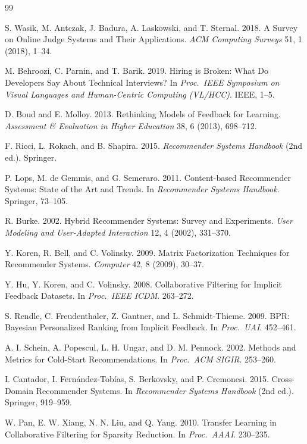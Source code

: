 \documentclass[12pt,a4paper]{article}
\begin{document}
\begin{thebibliography}{99}
\small

 S. Wasik, M. Antczak, J. Badura, A. Laskowski, and T. Sternal. 2018.
A Survey on Online Judge Systems and Their Applications. \emph{ACM Computing Surveys} 51,
1 (2018), 1--34.

 M. Behroozi, C. Parnin, and T. Barik. 2019. Hiring is Broken: What
Do Developers Say About Technical Interviews? In \emph{Proc.\ IEEE Symposium on Visual
Languages and Human-Centric Computing (VL/HCC)}. IEEE, 1--5.

 D. Boud and E. Molloy. 2013. Rethinking Models of Feedback for
Learning. \emph{Assessment \& Evaluation in Higher Education} 38, 6 (2013), 698--712.

 F. Ricci, L. Rokach, and B. Shapira. 2015. \emph{Recommender Systems
Handbook} (2nd ed.). Springer.

 P. Lops, M. de Gemmis, and G. Semeraro. 2011. Content-based Recommender
Systems: State of the Art and Trends. In \emph{Recommender Systems Handbook}. Springer,
73--105.

 R. Burke. 2002. Hybrid Recommender Systems: Survey and Experiments.
\emph{User Modeling and User-Adapted Interaction} 12, 4 (2002), 331--370.

 Y. Koren, R. Bell, and C. Volinsky. 2009. Matrix Factorization
Techniques for Recommender Systems. \emph{Computer} 42, 8 (2009), 30--37.

 Y. Hu, Y. Koren, and C. Volinsky. 2008. Collaborative Filtering for
Implicit Feedback Datasets. In \emph{Proc.\ IEEE ICDM}. 263--272.

 S. Rendle, C. Freudenthaler, Z. Gantner, and L. Schmidt-Thieme. 2009.
BPR: Bayesian Personalized Ranking from Implicit Feedback. In \emph{Proc.\ UAI}. 452--461.

 A. I. Schein, A. Popescul, L. H. Ungar, and D. M. Pennock. 2002.
Methods and Metrics for Cold-Start Recommendations. In \emph{Proc.\ ACM SIGIR}. 253--260.

 I. Cantador, I. Fern\'andez-Tob\'ias, S. Berkovsky, and P. Cremonesi.
2015. Cross-Domain Recommender Systems. In \emph{Recommender Systems Handbook} (2nd ed.).
Springer, 919--959.

 W. Pan, E. W. Xiang, N. N. Liu, and Q. Yang. 2010. Transfer Learning in
Collaborative Filtering for Sparsity Reduction. In \emph{Proc.\ AAAI}. 230--235.


\end{thebibliography}
\end{document}
